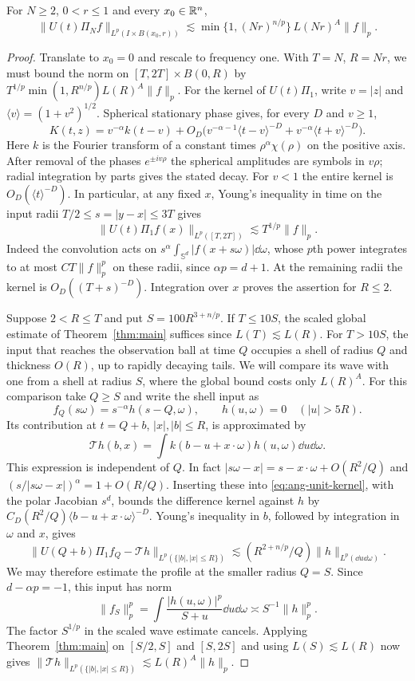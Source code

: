 \begin{lemma}\label{lem:angular-ball}
For $N\ge2$, $0<r\le1$ and every $x_0\in\mathbb R^n$,
\[
 \|U(t)\Pi_N f\|_{L^p(I\times B(x_0,r))}
 \lesssim \min\{1,(Nr)^{n/p}\}\,L(Nr)^A\|f\|_p .
\]
\end{lemma}
\begin{proof}
Translate to $x_0=0$ and rescale to frequency one. With $T=N$, $R=Nr$,
we must bound the norm on $[T,2T]\times B(0,R)$ by
$T^{1/p}\min(1,R^{n/p})L(R)^A\|f\|_p$.
For the kernel of $U(t)\Pi_1$, write $v=|z|$ and
$\langle v\rangle=(1+v^2)^{1/2}$. Spherical stationary phase gives,
for every $D$ and $v\ge1$,
\begin{equation}\label{eq:ang-unit-kernel}
 K(t,z)=v^{-\alpha} k(t-v)+
 O_D\big(v^{-\alpha-1}\langle t-v\rangle^{-D}
               +v^{-\alpha}\langle t+v\rangle^{-D}\big).
\end{equation}
Here $k$ is the Fourier transform of a constant times
$\rho^\alpha\chi(\rho)$ on the positive axis. After removal of the phases
$e^{\pm i v\rho}$ the spherical amplitudes are symbols in $v\rho$;
radial integration by parts gives the stated decay. For $v<1$ the entire
kernel is $O_D(\langle t\rangle^{-D})$. In particular, at any fixed $x$,
Young's inequality in time on the input radii $T/2\le s=|y-x|\le3T$
gives
\[
 \|U(t)\Pi_1 f(x)\|_{L^p([T,2T])}
 \lesssim T^{1/p}\|f\|_p.
\]
Indeed the convolution acts on
$s^\alpha\int_{\mathbb S^d}|f(x+s\omega)|\dd\omega$, whose $p$th power
integrates to at most $CT\|f\|_p^p$ on these radii, since $\alpha p=d+1$.
At the remaining radii the kernel is $O_D((T+s)^{-D})$.
Integration over $x$ proves the assertion for $R\le 2$.

Suppose $2<R\le T$ and put $S=100R^{3+n/p}$.
If $T\le10S$, the scaled global estimate of Theorem~\ref{thm:main}
suffices since $L(T)\lesssim L(R)$. For $T>10S$, the input that reaches
the observation ball at time $Q$ occupies a shell of radius $Q$ and
thickness $O(R)$, up to rapidly decaying tails. We will compare its wave
with one from a shell at radius $S$, where the global bound costs only
$L(R)^A$. For this comparison take $Q\ge S$ and write the shell input as
\[
 f_Q(s\omega)=s^{-\alpha}h(s-Q,\omega),\qquad
       h(u,\omega)=0\quad (|u|>5R).
\]
Its contribution at $t=Q+b$, $|x|,|b|\le R$, is approximated by
\[
 \mathcal T h(b,x)=\int k(b-u+x\cdot\omega)h(u,\omega)\dd u\dd\omega.
\]
This expression is independent of $Q$. In fact
$|s\omega-x|=s-x\cdot\omega+O(R^2/Q)$ and
$(s/|s\omega-x|)^\alpha=1+O(R/Q)$. Inserting these into
\eqref{eq:ang-unit-kernel}, with the polar Jacobian $s^d$, bounds the
difference kernel against $h$ by
$C_D(R^2/Q)\langle b-u+x\cdot\omega\rangle^{-D}$. Young's inequality
in $b$, followed by integration in $\omega$ and $x$, gives
\[
 \|U(Q+b)\Pi_1 f_Q-\mathcal T h\|_{L^p(\{|b|,|x|\le R\})}
 \lesssim (R^{2+n/p}/Q)\|h\|_{L^p(\dd u\dd\omega)} .
\]
We may therefore estimate the profile at the smaller radius $Q=S$.
Since $d-\alpha p=-1$, this input has norm
\[
 \|f_S\|_p^p=\int\frac{|h(u,\omega)|^p}{S+u}\dd u\dd\omega
       \asymp S^{-1}\|h\|_p^p .
\]
The factor $S^{1/p}$ in the scaled wave estimate cancels. Applying
Theorem~\ref{thm:main} on $[S/2,S]$ and $[S,2S]$ and using $L(S)\lesssim L(R)$
now gives $\|\mathcal T h\|_{L^p(\{|b|,|x|\le R\})}\lesssim L(R)^A\|h\|_p$.


\end{proof}
